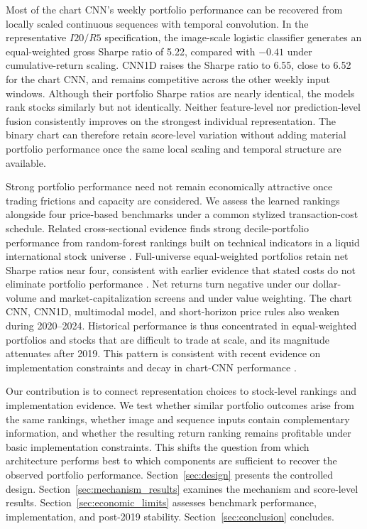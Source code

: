 Most of the chart CNN's weekly portfolio performance can be recovered from locally scaled continuous sequences with temporal convolution. In the representative $I20/R5$ specification, the image-scale logistic classifier generates an equal-weighted gross Sharpe ratio of 5.22, compared with $-0.41$ under cumulative-return scaling. CNN1D raises the Sharpe ratio to 6.55, close to 6.52 for the chart CNN, and remains competitive across the other weekly input windows. Although their portfolio Sharpe ratios are nearly identical, the models rank stocks similarly but not identically. Neither feature-level nor prediction-level fusion consistently improves on the strongest individual representation. The binary chart can therefore retain score-level variation without adding material portfolio performance once the same local scaling and temporal structure are available.

Strong portfolio performance need not remain economically attractive once trading frictions and capacity are considered. We assess the learned rankings alongside four price-based benchmarks under a common stylized transaction-cost schedule. Related cross-sectional evidence finds strong decile-portfolio performance from random-forest rankings built on technical indicators in a liquid international stock universe \parencite{breitungAutomatedStockPicking2023}. Full-universe equal-weighted portfolios retain net Sharpe ratios near four, consistent with earlier evidence that stated costs do not eliminate portfolio performance \parencite{reimagining_price_trends_jiang}. Net returns turn negative under our dollar-volume and market-capitalization screens and under value weighting. The chart CNN, CNN1D, multimodal model, and short-horizon price rules also weaken during 2020--2024. Historical performance is thus concentrated in equal-weighted portfolios and stocks that are difficult to trade at scale, and its magnitude attenuates after 2019. This pattern is consistent with recent evidence on implementation constraints and decay in chart-CNN performance \parencite{kaczmarekErodingNonScalableCNN2025}.

Our contribution is to connect representation choices to stock-level rankings and implementation evidence. We test whether similar portfolio outcomes arise from the same rankings, whether image and sequence inputs contain complementary information, and whether the resulting return ranking remains profitable under basic implementation constraints. This shifts the question from which architecture performs best to which components are sufficient to recover the observed portfolio performance. Section~\ref{sec:design} presents the controlled design. Section~\ref{sec:mechanism_results} examines the mechanism and score-level results. Section~\ref{sec:economic_limits} assesses benchmark performance, implementation, and post-2019 stability. Section~\ref{sec:conclusion} concludes.
